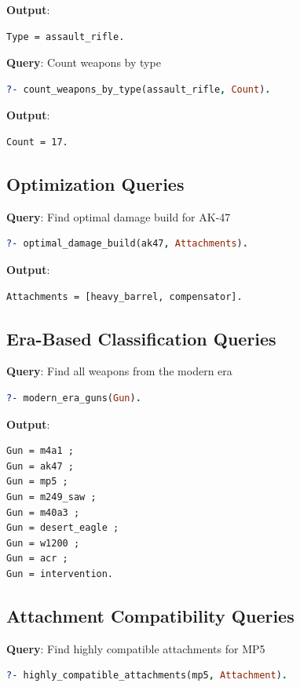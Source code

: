 \documentclass[12pt,a4paper]{article}
\begin{document}
\textbf{Output}:
\begin{lstlisting}
Type = assault_rifle.
\end{lstlisting}

\textbf{Query}: Count weapons by type
\begin{lstlisting}[language=Prolog]
?- count_weapons_by_type(assault_rifle, Count).
\end{lstlisting}

\textbf{Output}:
\begin{lstlisting}
Count = 17.
\end{lstlisting}

\subsection{Optimization Queries}

\textbf{Query}: Find optimal damage build for AK-47
\begin{lstlisting}[language=Prolog]
?- optimal_damage_build(ak47, Attachments).
\end{lstlisting}

\textbf{Output}:
\begin{lstlisting}
Attachments = [heavy_barrel, compensator].
\end{lstlisting}

\subsection{Era-Based Classification Queries}

\textbf{Query}: Find all weapons from the modern era
\begin{lstlisting}[language=Prolog]
?- modern_era_guns(Gun).
\end{lstlisting}

\textbf{Output}:
\begin{lstlisting}
Gun = m4a1 ;
Gun = ak47 ;
Gun = mp5 ;
Gun = m249_saw ;
Gun = m40a3 ;
Gun = desert_eagle ;
Gun = w1200 ;
Gun = acr ;
Gun = intervention.
\end{lstlisting}

\subsection{Attachment Compatibility Queries}

\textbf{Query}: Find highly compatible attachments for MP5
\begin{lstlisting}[language=Prolog]
?- highly_compatible_attachments(mp5, Attachment).
\end{lstlisting}
\end{document}
